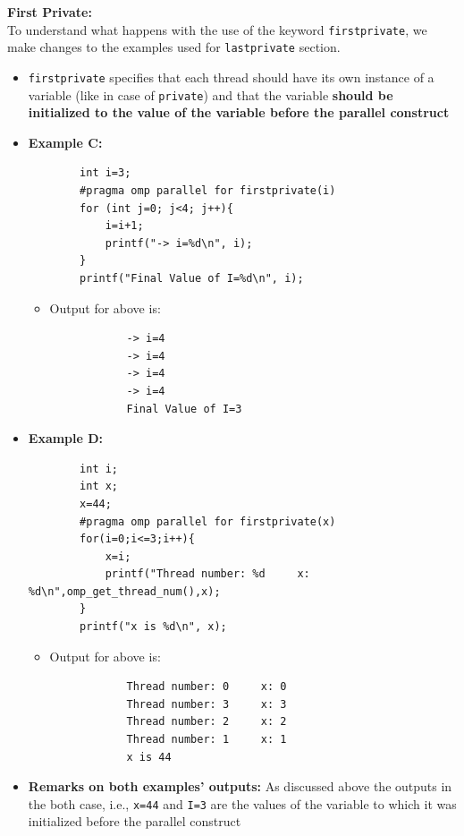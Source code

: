 \documentclass[12pt, a4paper]{report}
\begin{document}
{\bfseries{First Private:}}\\
To understand what happens with the use of the keyword \verb$firstprivate$, we make changes to the examples used for \verb$lastprivate$ section.
\begin{itemize}
    \item \verb$firstprivate$ specifies that each thread should have its own instance of a variable (like in case of \verb$private$) and that the
          variable {\bfseries{should be initialized to the value of the variable before the parallel construct}}
    \item {\bfseries{Example C:}}
    \begin{verbatim}
        int i=3;
        #pragma omp parallel for firstprivate(i)
        for (int j=0; j<4; j++){ 
            i=i+1;
            printf("-> i=%d\n", i); 
        }
        printf("Final Value of I=%d\n", i);
    \end{verbatim}
    \begin{itemize}
        \item Output for above is:
        \begin{verbatim}
            -> i=4
            -> i=4
            -> i=4
            -> i=4
            Final Value of I=3
        \end{verbatim}
    \end{itemize}
    \item {\bfseries{Example D:}}
    \begin{verbatim}
        int i;
        int x;
        x=44;
        #pragma omp parallel for firstprivate(x)
        for(i=0;i<=3;i++){
            x=i;
            printf("Thread number: %d     x: %d\n",omp_get_thread_num(),x);
        }
        printf("x is %d\n", x);
    \end{verbatim}
    \begin{itemize}
        \item Output for above is:
        \begin{verbatim}
            Thread number: 0     x: 0
            Thread number: 3     x: 3
            Thread number: 2     x: 2
            Thread number: 1     x: 1
            x is 44
        \end{verbatim}
    \end{itemize}
    \item {\bfseries{Remarks on both examples' outputs:}} As discussed above the outputs in the both case, i.e., \verb$x=44$ and \verb$I=3$
          are the values of the variable to which it was initialized before the parallel construct
\end{itemize}
\end{document}
